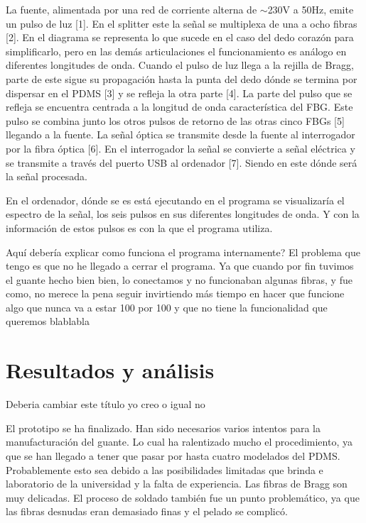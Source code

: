 La fuente, alimentada por una red de corriente alterna de $\sim$230V a 50Hz, emite un pulso de luz [1]. En el splitter este la señal se multiplexa de una a ocho fibras [2]. En el diagrama se representa lo que sucede en el caso del dedo corazón para simplificarlo, pero en las demás articulaciones el funcionamiento es análogo en diferentes longitudes de onda. Cuando el pulso de luz llega a la rejilla de Bragg, parte de este sigue su propagación hasta la punta del dedo dónde se termina por dispersar en el PDMS [3] y se refleja la otra parte [4]. La parte del pulso que se refleja se encuentra centrada a la longitud de onda característica del FBG. Este pulso se combina junto los otros pulsos de retorno de las otras cinco FBGs [5] llegando a la fuente. La señal óptica se transmite desde la fuente al interrogador por la fibra óptica [6]. En el interrogador la señal se convierte a señal eléctrica y se transmite a través del puerto USB al ordenador [7]. Siendo en este dónde será la señal procesada.

En el ordenador, dónde se es está ejecutando en el programa se visualizaría el espectro de la señal, los seis pulsos en sus diferentes longitudes de onda. Y con la información de estos pulsos es con la que el programa utiliza. 

\textcolor{rositaoscuro}{Aquí debería explicar como funciona el programa internamente? El problema que tengo es que no he llegado a cerrar el programa. Ya que cuando por fin tuvimos el guante hecho bien bien, lo conectamos y no funcionaban algunas fibras, y fue como, no merece la pena seguir invirtiendo más tiempo en hacer que funcione algo que nunca va a estar 100 por 100 y que no tiene la funcionalidad que queremos blablabla}

\section{Resultados y análisis}
\label{sec:resultados3}

\textcolor{rositaoscuro}{Deberia cambiar este título yo creo o igual no}

El prototipo se ha finalizado. Han sido necesarios varios intentos para la manufacturación del guante. Lo cual ha ralentizado mucho el procedimiento, ya que se han llegado a tener que pasar por hasta cuatro modelados del PDMS. Probablemente esto sea debido a las posibilidades limitadas que brinda e laboratorio de la universidad y la falta de experiencia. Las fibras de Bragg son muy delicadas. El proceso de soldado también fue un punto problemático, ya que las fibras desnudas eran demasiado finas y el pelado se complicó. 

